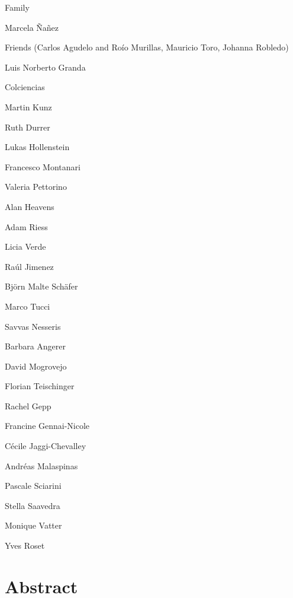\documentclass[12pt]{report}
\renewcommand{\(}{\left(}
\renewcommand{\)}{\right)}
\renewcommand{\[}{\left[}
\renewcommand{\]}{\right]}
\begin{document}
\vspace{3mm}

Family 

Marcela \~{N}a\~{n}ez

Friends (Carlos Agudelo and Ro\'{i}o Murillas, Mauricio Toro, Johanna Robledo)

Luis Norberto Granda 

Colciencias 

Martin Kunz 

Ruth Durrer

Lukas Hollenstein 

Francesco Montanari 

Valeria Pettorino

Alan Heavens

Adam Riess

Licia Verde 

Ra\'{u}l Jimenez 

Bj\"{o}rn Malte Sch\"{a}fer

Marco Tucci

Savvas Nesseris

Barbara Angerer 

David Mogrovejo 

Florian Teischinger 

Rachel Gepp

Francine Gennai-Nicole

C\'{e}cile Jaggi-Chevalley

Andr\'{e}as Malaspinas

Pascale Sciarini

Stella Saavedra

Monique Vatter 

Yves Roset
  
\newpage  

\chapter*{Abstract}  

\vspace{3mm}
\end{document}
